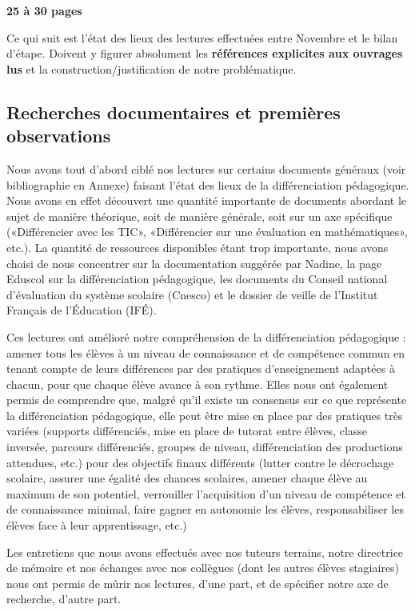 {\color{red}\textbf{25 à 30 pages}

Ce qui suit est l'état des lieux des lectures effectuées entre Novembre et le bilan d'étape. Doivent y figurer absolument les \textbf{références explicites aux ouvrages lus} et la construction/justification de notre problématique.}

\subsection{Recherches documentaires et premières observations}

Nous avons tout d’abord ciblé nos lectures sur certains documents généraux (voir bibliographie en Annexe) faisant l’état des lieux de la différenciation pédagogique. Nous avons en effet découvert une quantité importante de documents abordant le sujet de manière théorique, soit de manière générale, soit sur un axe spécifique («Différencier avec les TIC», «Différencier sur une évaluation en mathématiques», etc.). La quantité de ressources disponibles étant trop importante, nous avons choisi de nous concentrer sur la documentation suggérée par Nadine, la page Eduscol sur la différenciation pédagogique, les documents du Conseil national d’évaluation du système scolaire (Cnesco) et le dossier de veille de l’Institut Français de l’Éducation (IFÉ).

Ces lectures ont amélioré notre compréhension de la différenciation pédagogique : amener tous les élèves à un niveau de connaissance et de compétence commun en tenant compte de leurs différences par des pratiques d’enseignement adaptées à chacun, pour que chaque élève avance à son rythme. Elles nous ont également permis de comprendre que, malgré qu’il existe un consensus sur ce que représente la différenciation pédagogique, elle peut être mise en place par des pratiques très variées (supports différenciés, mise en place de tutorat entre élèves, classe inversée, parcours différenciés, groupes de niveau, différenciation des productions attendues, etc.) pour des objectifs finaux différents (lutter contre le décrochage scolaire, assurer une égalité des chances scolaires, amener chaque élève au maximum de son potentiel, verrouiller l’acquisition d’un niveau de compétence et de connaissance minimal, faire gagner en autonomie les élèves, responsabiliser les élèves face à leur apprentissage, etc.) 

Les entretiens que nous avons effectués avec nos tuteurs terrains, notre directrice de mémoire et nos échanges avec nos collègues (dont les autres élèves stagiaires) nous ont permis de mûrir nos lectures, d’une part, et de spécifier notre axe de recherche, d’autre part.

